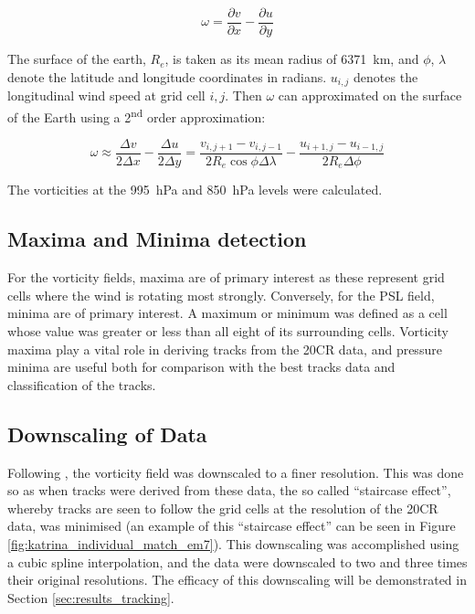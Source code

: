\documentclass[pdftex,12pt,a4paper]{report}
\newcommand{\ts}{\textsuperscript}
\begin{document}
\begin{equation}
    \omega = \frac{\partial v}{\partial x} - \frac{\partial u}{\partial y}
    \label{eqn:vorticity}
\end{equation}

The surface of the earth, $R_e$, is taken as its mean radius of \SI{6371}{km}, and $\phi$, $\lambda$
denote the latitude and longitude coordinates in radians. $u_{i, j}$ denotes the longitudinal wind
speed at grid cell $i, j$. Then $\omega$ can approximated on the surface of the Earth using a
2\ts{nd} order approximation: %


\begin{equation}
    \omega \approx \frac{\Delta v}{2 \Delta x} - \frac{\Delta u}{2 \Delta y} = \frac{v_{i,j+1} - v_{i,j-1}}{2 R_e \cos{\phi} \Delta \lambda} - \frac{u_{i+1,j} - u_{i-1,j}}{2 R_e \Delta \phi }
    \label{eqn:vorticity_2nd_order}
\end{equation}

The vorticities at the \SI{995}{hPa} and \SI{850}{hPa} levels were calculated.

\subsection{Maxima and Minima detection}
\label{sec:methods_maxima_minima}

For the vorticity fields, maxima are of primary interest as these represent grid cells where the
wind is rotating most strongly. Conversely, for the PSL field, minima are of primary interest. A
maximum or minimum was defined as a cell whose value was greater or less than all eight of its
surrounding cells. Vorticity maxima play a vital role in deriving tracks from the 20CR data, and
pressure minima are useful both for comparison with the best tracks data and classification of the
tracks.

\subsection{Downscaling of Data}

Following \textcite{TODOCITE hodgesXXX}, the vorticity field was downscaled to a finer resolution. This was
done so as when tracks were derived from these data, the so called ``staircase effect'', whereby
tracks are seen to follow the grid cells at the resolution of the 20CR data, was minimised (an
example of this ``staircase effect'' can be seen in Figure \ref{fig:katrina_individual_match_em7}). This
downscaling was accomplished using a cubic spline interpolation, and the data were downscaled to two and
three times their original resolutions. The efficacy of this downscaling will be demonstrated in
Section \ref{sec:results_tracking}.
\end{document}
